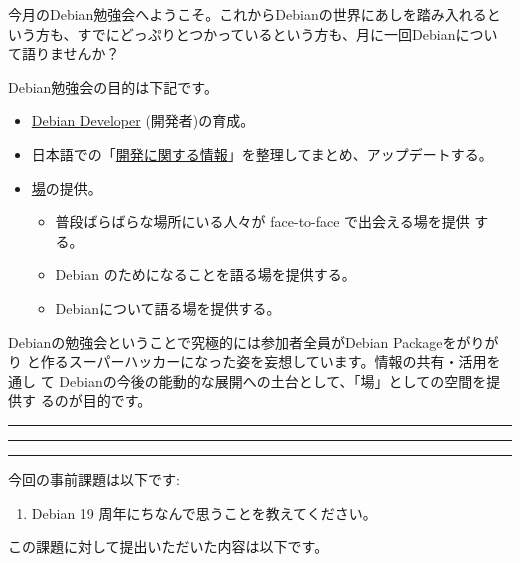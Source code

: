 \documentclass[mingoth,a4paper]{jsarticle}
\begin{document}
\begin{multicols}{2}
 

 今月のDebian勉強会へようこそ。これからDebianの世界にあしを踏み入れると
 いう方も、すでにどっぷりとつかっているという方も、月に一回Debianについ
 て語りませんか？

 Debian勉強会の目的は下記です。

 \begin{itemize}
 \item \underline{Debian Developer} (開発者)の育成。
 \item 日本語での「\underline{開発に関する情報}」を整理してまとめ、アップデートする。
 \item \underline{場}の提供。
 \begin{itemize}
  \item 普段ばらばらな場所にいる人々が face-to-face で出会える場を提供
	する。
  \item Debian のためになることを語る場を提供する。
  \item Debianについて語る場を提供する。
 \end{itemize}
 \end{itemize}		

 Debianの勉強会ということで究極的には参加者全員がDebian Packageをがりがり
 と作るスーパーハッカーになった姿を妄想しています。情報の共有・活用を通し
 て Debianの今後の能動的な展開への土台として、「場」としての空間を提供す
 るのが目的です。

\end{multicols}

\newpage

\begin{minipage}[b]{0.2\hsize}
 \colorbox{titleback}{}
\end{minipage}
\begin{minipage}[b]{0.8\hsize}
\hrule
\vspace{2mm}
\hrule
\begin{multicols}{2}
\tableofcontents
\end{multicols}
\vspace{2mm}
\hrule
\end{minipage}


今回の事前課題は以下です:
\begin{enumerate}
 \item Debian 19 周年にちなんで思うことを教えてください。
\end{enumerate}
この課題に対して提出いただいた内容は以下です。
\begin{multicols}{2}
{\small

}
\end{multicols}
\end{document}
